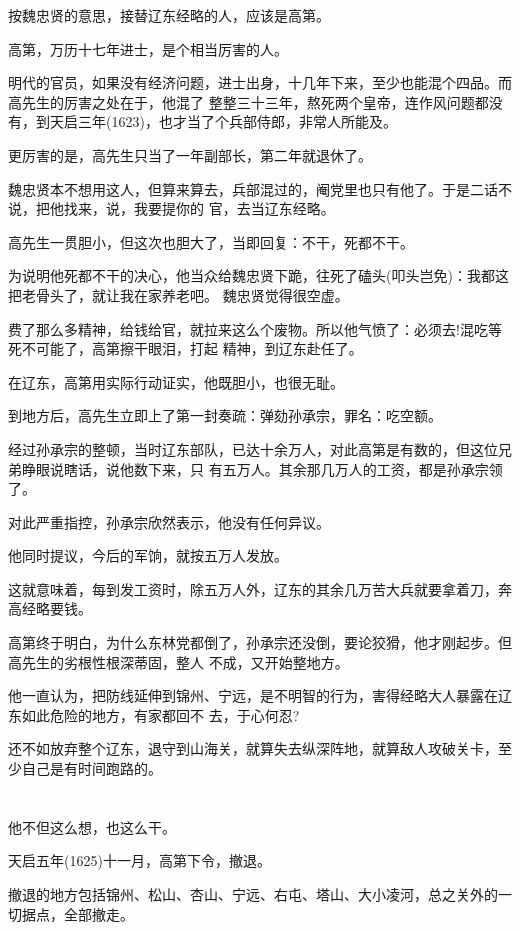 \documentclass[11pt,a4paper,onecolumn]{article}
\begin{document}
按魏忠贤的意思，接替辽东经略的人，应该是高第。

高第，万历十七年进士，是个相当厉害的人。

明代的官员，如果没有经济问题，进士出身，十几年下来，至少也能混个四品。而高先生的厉害之处在于，他混了
整整三十三年，熬死两个皇帝，连作风问题都没有，到天启三年(1623)，也才当了个兵部侍郎，非常人所能及。

更厉害的是，高先生只当了一年副部长，第二年就退休了。

魏忠贤本不想用这人，但算来算去，兵部混过的，阉党里也只有他了。于是二话不说，把他找来，说，我要提你的
官，去当辽东经略。

高先生一贯胆小，但这次也胆大了，当即回复：不干，死都不干。

为说明他死都不干的决心，他当众给魏忠贤下跪，往死了磕头(叩头岂免)：我都这把老骨头了，就让我在家养老吧。
魏忠贤觉得很空虚。

费了那么多精神，给钱给官，就拉来这么个废物。所以他气愤了：必须去!混吃等死不可能了，高第擦干眼泪，打起
精神，到辽东赴任了。

在辽东，高第用实际行动证实，他既胆小，也很无耻。

到地方后，高先生立即上了第一封奏疏：弹劾孙承宗，罪名：吃空额。

经过孙承宗的整顿，当时辽东部队，已达十余万人，对此高第是有数的，但这位兄弟睁眼说瞎话，说他数下来，只
有五万人。其余那几万人的工资，都是孙承宗领了。

对此严重指控，孙承宗欣然表示，他没有任何异议。

他同时提议，今后的军饷，就按五万人发放。

这就意味着，每到发工资时，除五万人外，辽东的其余几万苦大兵就要拿着刀，奔高经略要钱。

高第终于明白，为什么东林党都倒了，孙承宗还没倒，要论狡猾，他才刚起步。但高先生的劣根性根深蒂固，整人
不成，又开始整地方。

他一直认为，把防线延伸到锦州、宁远，是不明智的行为，害得经略大人暴露在辽东如此危险的地方，有家都回不
去，于心何忍?

还不如放弃整个辽东，退守到山海关，就算失去纵深阵地，就算敌人攻破关卡，至少自己是有时间跑路的。

\section[\thesection]{}

他不但这么想，也这么干。

天启五年(1625)十一月，高第下令，撤退。

撤退的地方包括锦州、松山、杏山、宁远、右屯、塔山、大小凌河，总之关外的一切据点，全部撤走。
\end{document}
